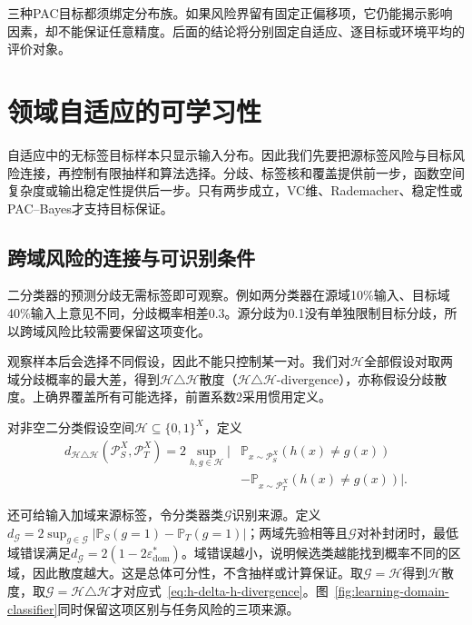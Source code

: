 三种PAC目标都须绑定分布族。如果风险界留有固定正偏移项，它仍能揭示影响因素，却不能保证任意精度。后面的结论将分别固定自适应、逐目标或环境平均的评价对象。

\section{领域自适应的可学习性}
\label{sec:domain-adaptation}

自适应中的无标签目标样本只显示输入分布。因此我们先要把源标签风险与目标风险连接，再控制有限抽样和算法选择。分歧、标签核和覆盖提供前一步，函数空间复杂度或输出稳定性提供后一步。只有两步成立，VC维、Rademacher、稳定性或PAC--Bayes才支持目标保证。

\subsection{跨域风险的连接与可识别条件}
\label{sec:adaptation-risk}

二分类器的预测分歧无需标签即可观察。例如两分类器在源域10\%输入、目标域40\%输入上意见不同，分歧概率相差0.3。源分歧为0.1没有单独限制目标分歧，所以跨域风险比较需要保留这项变化。

观察样本后会选择不同假设，因此不能只控制某一对。我们对$\mathcal H$全部假设对取两域分歧概率的最大差，得到$\mathcal H\triangle\mathcal H$散度（$\mathcal H\triangle\mathcal H$-divergence），亦称假设分歧散度。上确界覆盖所有可能选择，前置系数2采用惯用定义。

\begin{definition}[假设分歧散度]
\label{def:h-delta-h-divergence}
对非空二分类假设空间$\mathcal H\subseteq\{0,1\}^{X}$，定义
\begin{equation}
 \begin{aligned}
 d_{\mathcal H\triangle\mathcal H}(\mathcal P_S^X,\mathcal P_T^X)
 =2\sup_{h,g\in\mathcal H}
 \big|&\mathbb P_{x\sim\mathcal P_S^X}(h(x)\neq g(x))\\
       &-\mathbb P_{x\sim\mathcal P_T^X}(h(x)\neq g(x))\big|.
 \end{aligned}
 \label{eq:h-delta-h-divergence}
\end{equation}
\end{definition}

还可给输入加域来源标签，令分类器类$\mathcal G$识别来源。定义$d_{\mathcal G}=2\sup_{g\in\mathcal G}|\mathbb P_S(g=1)-\mathbb P_T(g=1)|$；两域先验相等且$\mathcal G$对补封闭时，最低域错误满足$d_{\mathcal G}=2(1-2\varepsilon_{\mathrm{dom}}^*)$。域错误越小，说明候选类越能找到概率不同的区域，因此散度越大。这是总体可分性，不含抽样或计算保证。取$\mathcal G=\mathcal H$得到$\mathcal H$散度，取$\mathcal G=\mathcal H\triangle\mathcal H$才对应式~\eqref{eq:h-delta-h-divergence}。图~\ref{fig:learning-domain-classifier}同时保留这项区别与任务风险的三项来源。

